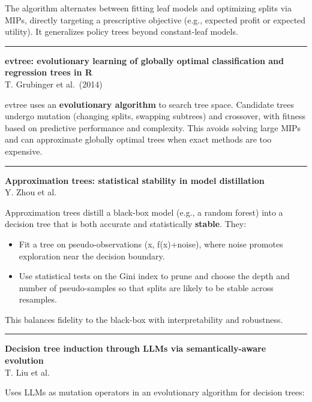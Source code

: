 \documentclass[a5paper]{article}
\providecommand{\tightlist}{%
  \setlength{\itemsep}{0pt}\setlength{\parskip}{0pt}}
\begin{document}
The algorithm alternates between fitting leaf models and optimizing
splits via MIPs, directly targeting a prescriptive objective (e.g.,
expected profit or expected utility). It generalizes policy trees beyond
constant-leaf models.

\begin{center}\rule{0.5\linewidth}{0.5pt}\end{center}

\textbf{evtree: evolutionary learning of globally optimal classification
and regression trees in R}\\
T. Grubinger et al.~(2014)

evtree uses an \textbf{evolutionary algorithm} to search tree space.
Candidate trees undergo mutation (changing splits, swapping subtrees)
and crossover, with fitness based on predictive performance and
complexity. This avoids solving large MIPs and can approximate globally
optimal trees when exact methods are too expensive.

\begin{center}\rule{0.5\linewidth}{0.5pt}\end{center}

\textbf{Approximation trees: statistical stability in model
distillation}\\
Y. Zhou et al.

Approximation trees distill a black-box model (e.g., a random forest)
into a decision tree that is both accurate and statistically
\textbf{stable}. They:

\begin{itemize}
\tightlist
\item
  Fit a tree on pseudo-observations (x, f(x)+noise), where noise
  promotes exploration near the decision boundary.
\item
  Use statistical tests on the Gini index to prune and choose the depth
  and number of pseudo-samples so that splits are likely to be stable
  across resamples.
\end{itemize}

This balances fidelity to the black-box with interpretability and
robustness.

\begin{center}\rule{0.5\linewidth}{0.5pt}\end{center}

\textbf{Decision tree induction through LLMs via semantically-aware
evolution}\\
T. Liu et al.

Uses LLMs as mutation operators in an evolutionary algorithm for
decision trees:
\end{document}
